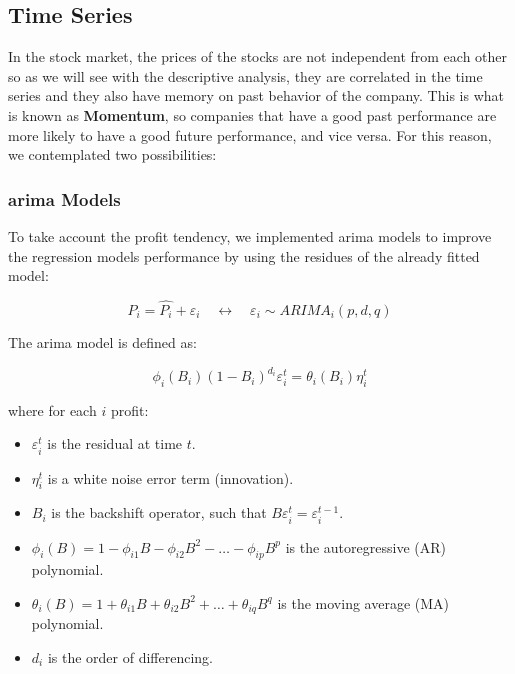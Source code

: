 \documentclass[11pt,english,a4paper,hidelinks]{book}
\begin{document}
\subsection{Time Series}
In the stock market, the prices of the stocks are not independent from each other so as we will see with the descriptive analysis, they are correlated in the time series and they also have memory on past behavior of the company. This is what is known as \textbf{Momentum}, so companies that have a good past performance are more likely to have a good future performance, and vice versa. For this reason, we contemplated two possibilities:

\subsubsection{\Acrshort{arima} Models}
To take account the profit tendency, we implemented \acrshort{arima} models to improve the regression models performance by using the residues of the already fitted model:

\begin{equation}
    P_i = \hat{P_i} + {\varepsilon_i} \quad \longleftrightarrow \quad {\varepsilon_i} \sim ARIMA_i(p,d,q)
\end{equation}

\noindent The \acrshort{arima} model is defined as:

\begin{equation}
    \phi_i(B_i){(1 - B_i)}^{d_i} \varepsilon_i^t = \theta_i(B_i) \eta_i^t
    \end{equation}
    
    \noindent where for each \(i\) profit:
    \begin{itemize}
      \item \(\varepsilon_i^t\) is the residual at time \(t\).
      \item \(\eta_i^t\) is a white noise error term (innovation).
      \item \(B_i\) is the backshift operator, such that \(B \varepsilon_i^t = \varepsilon_i^{t-1}\).
      \item \(\phi_i(B) = 1 - \phi_{i1} B - \phi_{i2} B^2 - \dots - \phi_{ip} B^p\) is the autoregressive (AR) polynomial.
      \item \(\theta_i(B) = 1 + \theta_{i1} B + \theta_{i2} B^2 + \dots + \theta_{iq} B^q\) is the moving average (MA) polynomial.
      \item \(d_i\) is the order of differencing.
    \end{itemize}
    
\end{document}
